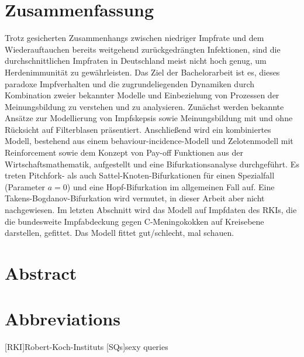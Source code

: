 \documentclass[12pt,a4paper,twoside]{article}
\begin{document}
\newpage
\section*{Zusammenfassung}
Trotz gesicherten Zusammenhangs zwischen niedriger Impfrate und dem Wiederauftauchen bereits weitgehend zurückgedrängten Infektionen, sind die durchschnittlichen Impfraten in Deutschland meist nicht hoch genug, um Herdenimmunität zu gewährleisten. Das Ziel der Bachelorarbeit ist es, dieses paradoxe Impfverhalten und die zugrundeliegenden Dynamiken durch Kombination zweier bekannter Modelle und Einbeziehung von Prozessen der Meinungsbildung zu verstehen und zu analysieren. Zunächst werden bekannte Ansätze zur Modellierung von Impfskepsis sowie Meinungsbildung mit und ohne Rücksicht auf Filterblasen präsentiert. Anschließend wird ein kombiniertes Modell, bestehend aus einem behaviour-incidence-Modell und Zelotenmodell mit Reinforcement sowie dem Konzept von Pay-off Funktionen aus der Wirtschaftsmathematik, aufgestellt und eine Bifurkationsanalyse durchgeführt. Es treten Pitchfork- als auch Sattel-Knoten-Bifurkationen für einen Spezialfall (Parameter $a=0$) und eine Hopf-Bifurkation im allgemeinen Fall auf. Eine Takens-Bogdanov-Bifurkation wird vermutet, in dieser Arbeit aber nicht nachgewiesen. Im letzten Abschnitt wird das Modell auf Impfdaten des \acfp{RKI}, die die bundesweite Impfabdeckung gegen C-Meningokokken auf Kreisebene darstellen, gefittet. Das Modell fittet gut/schlecht, mal schauen.%

\section*{Abstract}
\newpage
\tableofcontents
\newpage

\pagestyle{headings}

\newpage


\section*{Abbreviations}

\begin{acronym}[STIKO]%
	[RKI]{Robert-Koch-Instituts}
	[SQs]{sexy queries}
\end{acronym}
\end{document}

